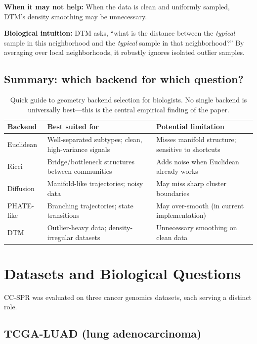 \documentclass[11pt]{article}
\begin{document}
\textbf{When it may not help:} When the data is clean and uniformly sampled, DTM's density smoothing may be unnecessary.

\textbf{Biological intuition:} DTM asks, ``what is the distance between the \emph{typical} sample in this neighborhood and the \emph{typical} sample in that neighborhood?''
By averaging over local neighborhoods, it robustly ignores isolated outlier samples.

\subsection{Summary: which backend for which question?}

\begin{table}[h]
\centering
\small
\begin{tabular}{p{2.2cm}p{4.5cm}p{4.5cm}}
\toprule
\textbf{Backend} & \textbf{Best suited for} & \textbf{Potential limitation} \\
\midrule
Euclidean & Well-separated subtypes; clean, high-variance signals & Misses manifold structure; sensitive to shortcuts \\
Ricci & Bridge/bottleneck structures between communities & Adds noise when Euclidean already works \\
Diffusion & Manifold-like trajectories; noisy data & May miss sharp cluster boundaries \\
PHATE-like & Branching trajectories; state transitions & May over-smooth (in current implementation) \\
DTM & Outlier-heavy data; density-irregular datasets & Unnecessary smoothing on clean data \\
\bottomrule
\end{tabular}
\caption{Quick guide to geometry backend selection for biologists.
No single backend is universally best---this is the central empirical finding of the paper.}
\label{tab:backendguide}
\end{table}

\section{Datasets and Biological Questions}
\label{sec:datasets}

CC-SPR was evaluated on three cancer genomics datasets, each serving a distinct role.

\subsection{TCGA-LUAD (lung adenocarcinoma)}
\end{document}
